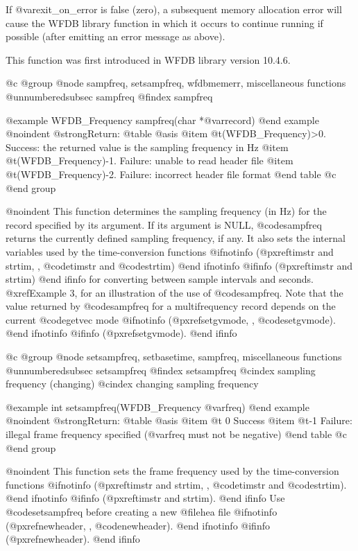 {{{{{{{{If @var{exit_on_error} is false (zero), a subsequent memory allocation error
will cause the WFDB library function in which it occurs to continue running
if possible (after emitting an error message as above).

This function was first introduced in WFDB library version 10.4.6.

@c @group
@node     sampfreq, setsampfreq, wfdbmemerr, miscellaneous functions
@unnumberedsubsec sampfreq
@findex sampfreq

@example
WFDB_Frequency sampfreq(char *@var{record})
@end example
@noindent
@strong{Return:}
@table @asis
@item @t{(WFDB_Frequency)>0.}
Success: the returned value is the sampling frequency in Hz
@item @t{(WFDB_Frequency)-1.}
Failure: unable to read header file
@item @t{(WFDB_Frequency)-2.}
Failure: incorrect header file format
@end table
@c @end group

@noindent
This function determines the sampling frequency (in Hz) for the record
specified by its argument.  If its argument is NULL, @code{sampfreq}
returns the currently defined sampling frequency, if any.  It also sets
the internal variables used by the time-conversion functions
@ifnotinfo
(@pxref{timstr and strtim, , @code{timstr} and @code{strtim}})
@end ifnotinfo
@ifinfo
(@pxref{timstr and strtim})
@end ifinfo
for converting between sample intervals and seconds.  @xref{Example 3},
for an illustration of the use of @code{sampfreq}.  Note that the value
returned by @code{sampfreq} for a multifrequency record depends on the
current @code{getvec} mode
@ifnotinfo
(@pxref{setgvmode, , @code{setgvmode}}).
@end ifnotinfo
@ifinfo
(@pxref{setgvmode}).
@end ifinfo

@c @group
@node     setsampfreq, setbasetime, sampfreq, miscellaneous functions
@unnumberedsubsec setsampfreq
@findex setsampfreq
@cindex sampling frequency (changing)
@cindex changing sampling frequency

@example
int setsampfreq(WFDB_Frequency @var{freq})
@end example
@noindent
@strong{Return:}
@table @asis
@item @t{ 0}
Success
@item @t{-1}
Failure:  illegal frame frequency specified (@var{freq} must not be
negative)
@end table
@c @end group

@noindent
This function sets the frame frequency used by the time-conversion
functions
@ifnotinfo
(@pxref{timstr and strtim, , @code{timstr} and @code{strtim}}).
@end ifnotinfo
@ifinfo
(@pxref{timstr and strtim}).
@end ifinfo
Use @code{setsampfreq} before creating a new @file{hea} file
@ifnotinfo
(@pxref{newheader, , @code{newheader}}).
@end ifnotinfo
@ifinfo
(@pxref{newheader}).
@end ifinfo

}}}}}}}}
